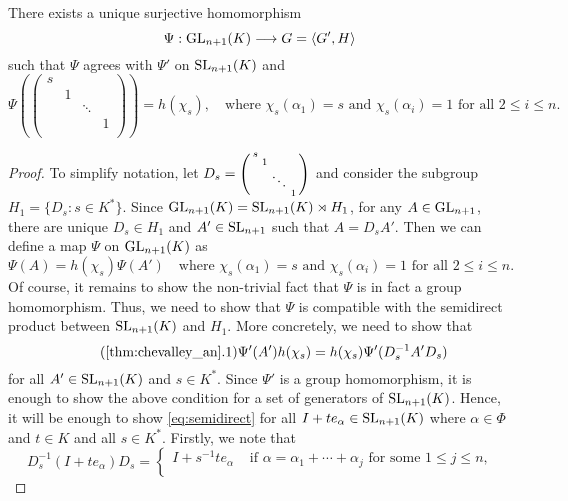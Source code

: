 \begin{theorem}\label{thm:chevalley_an}
    There exists a unique surjective homomorphism 
    $$\Psi:\GL_{n+1}(K)\longrightarrow G=\langle G',H\rangle$$
    such that $\Psi$ agrees with $\Psi'$ on $\SL_{n+1}(K)$ and 
    $$\Psi\left(\begin{pmatrix}
        s &  & & \\
         & 1 & & \\
         & & \ddots & \\
         & & & 1\\
    \end{pmatrix}\right)=h(\chi_s),\quad\text{where }\chi_s(\alpha_1)=s \text{ and }\chi_s(\alpha_i)=1 \text{ for all }2\leq i\leq n.$$
\end{theorem}
\begin{proof}
    To simplify notation, let $D_s=\begin{psmallmatrix}
        s &  & & \\
         & 1 & & \\
         & & \ddots & \\
         & & & 1\\
    \end{psmallmatrix}$ and consider the subgroup $H_1=\{D_s:s\in K^*\}$. Since 
    $\GL_{n+1}(K)=\SL_{n+1}(K)\rtimes H_1$, for any $A\in\GL_{n+1}$, there are unique $D_s\in H_1$ and $A'\in\SL_{n+1}$ such that $A=D_s A'$. Then we can define a map $\Psi$ on $\GL_{n+1}(K)$ as 
    $$\Psi(A)=h(\chi_s)\Psi(A')\quad\text{where }\chi_s(\alpha_1)=s \text{ and }\chi_s(\alpha_i)=1 \text{ for all }2\leq i\leq n.$$
    Of course, it remains to show the non-trivial fact that $\Psi$ is in fact a group homomorphism. Thus, we need to show that $\Psi$ is compatible with the semidirect product between $\SL_{n+1}(K)$ and $H_1$. More concretely, we need to show that 
    \begin{equation}\tag{\ref{thm:chevalley_an}.1}\label{eq:semidirect}
        \Psi'(A')h(\chi_s)=h(\chi_s)\Psi'(D_s^{-1}A'D_s)
    \end{equation}
    for all $A'\in\SL_{n+1}(K)$ and $s\in K^*$. Since $\Psi'$ is a group homomorphism, it is enough to show the above condition for a set of generators of $\SL_{n+1}(K)$. Hence, it will be enough to show \eqref{eq:semidirect} for all $I+t e_\alpha\in\SL_{n+1}(K)$ where $\alpha\in\Phi$ and $t\in K$ and all $s\in K^*$. Firstly, we note that 
    $$D_s^{-1}(I+t e_\alpha)D_s=\begin{cases}
        I+s^{-1}t e_\alpha & \text{ if }\alpha=\alpha_1+\cdots+\alpha_j \text{ for some $1\leq j\leq n$,}\\

\end{cases}$$
\end{proof}
